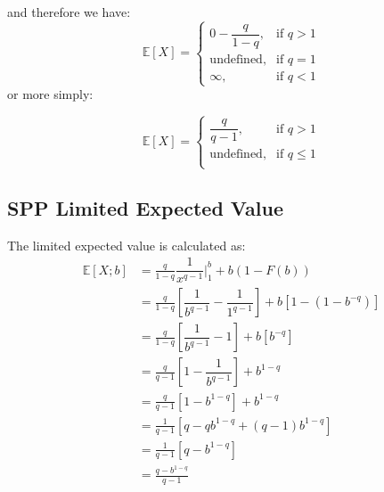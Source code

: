 \documentclass[]{article} %
\begin{document}
and therefore we have: 
\[
\mathbb{E}[X]  = 
\begin{cases}
0 - \dfrac{q}{1-q},& \text{if } q > 1\\
\text{undefined},& \text{if } q = 1\\         
\infty, & \text{if }q < 1
\end{cases}
\]
or more simply:

\begin{equation}
\mathbb{E}[X]  = 
\begin{cases}
\dfrac{q}{q-1},& \text{if } q > 1\\
\text{undefined},& \text{if } q \leq 1\\         
\end{cases}
\end{equation}

\subsection{SPP Limited Expected Value}\label{ParetoLEV}
The limited expected value is calculated as:
\begin{align}
	\mathbb{E}[X;b] 	&= \frac{q}{1-q} \dfrac{1}{x^{q-1}} \Big|_{1}^{b} + b  (1-F(b))\nonumber\\
 	&=  \frac{q}{1-q} \left[ \dfrac{1}{b^{q-1}} - \dfrac{1}{1^{q-1}}\right]+  b  \left[1-(1-b^{-q})\right]\nonumber\\
 	&=  \frac{q}{1-q} \left[ \dfrac{1}{b^{q-1}} - 1\right]+  b  \left[b^{-q}\right]\nonumber\\
 	&=  \frac{q}{q-1} \left[1 - \dfrac{1}{b^{q-1}}\right]+ b^{1-q}\nonumber\\
 	&=  \frac{q}{q-1} \left[1 - b^{1-q}\right]+b^{1-q}\\ %
 	&=  \frac{1}{q-1} \left[q - qb^{1-q} + (q-1)b^{1-q}\right]\nonumber\\
 	&=  \frac{1}{q-1} \left[q - b^{1-q}\right]\nonumber\\
 	&=	\frac{q - b^{1-q}}{q-1}
 \end{align}
 \newpage
\end{document}
